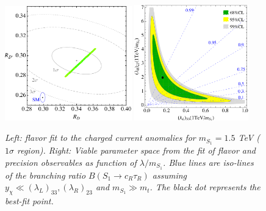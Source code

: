 \documentclass[11pt]{cernrep}
\begin{document}
 \begin{figure}[!htp]
  \centering
  \includegraphics[width=0.49\textwidth]{./figures/FlavorFit_RDRDst.pdf} 
  \includegraphics[width=0.44\textwidth]{./figures/FlavorFit_S1.pdf} 
  \caption{\it Left: flavor fit to the charged current anomalies for $m_{S_1}=1.5$ TeV ($1\sigma$ region). Right: Viable parameter space from the fit of flavor and precision observables as function of $\lambda / m_{S_1}$. Blue lines are iso-lines of the branching ratio $B(S_1 \to c_R \tau_R)$ assuming $y_\chi \ll (\lambda_L)_{33}, (\lambda_R)_{23}$ and $m_{S_1} \gg m_t$. The black dot represents the best-fit point.}
\label{fig:FlaFit}
\end{figure}
\end{document}
